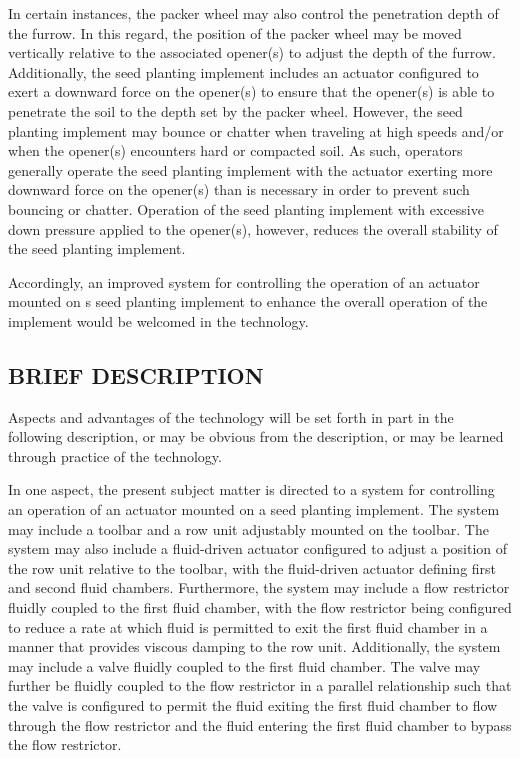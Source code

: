 \documentclass[11pt,a4paper]{article}
\begin{document}
In certain instances, the packer wheel may also control the penetration depth of the furrow. In this regard, the position of the packer wheel may be moved vertically relative to the associated opener(s) to adjust the depth of the furrow. Additionally, the seed planting implement includes an actuator configured to exert a downward force on the opener(s) to ensure that the opener(s) is able to penetrate the soil to the depth set by the packer wheel. However, the seed planting implement may bounce or chatter when traveling at high speeds and/or when the opener(s) encounters hard or compacted soil. As such, operators generally operate the seed planting implement with the actuator exerting more downward force on the opener(s) than is necessary in order to prevent such bouncing or chatter. Operation of the seed planting implement with excessive down pressure applied to the opener(s), however, reduces the overall stability of the seed planting implement.

Accordingly, an improved system for controlling the operation of an actuator mounted on s seed planting implement to enhance the overall operation of the implement would be welcomed in the technology.

\subsection{BRIEF DESCRIPTION}

Aspects and advantages of the technology will be set forth in part in the following description, or may be obvious from the description, or may be learned through practice of the technology.

In one aspect, the present subject matter is directed to a system for controlling an operation of an actuator mounted on a seed planting implement. The system may include a toolbar and a row unit adjustably mounted on the toolbar. The system may also include a fluid-driven actuator configured to adjust a position of the row unit relative to the toolbar, with the fluid-driven actuator defining first and second fluid chambers. Furthermore, the system may include a flow restrictor fluidly coupled to the first fluid chamber, with the flow restrictor being configured to reduce a rate at which fluid is permitted to exit the first fluid chamber in a manner that provides viscous damping to the row unit. Additionally, the system may include a valve fluidly coupled to the first fluid chamber. The valve may further be fluidly coupled to the flow restrictor in a parallel relationship such that the valve is configured to permit the fluid exiting the first fluid chamber to flow through the flow restrictor and the fluid entering the first fluid chamber to bypass the flow restrictor.
\end{document}
